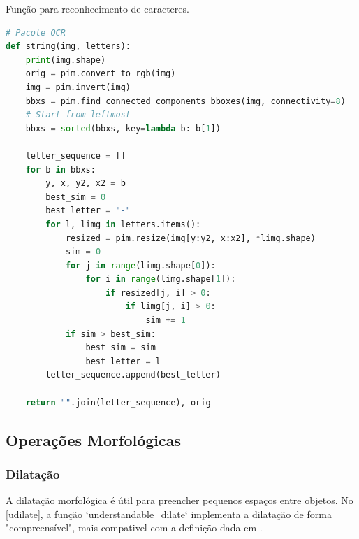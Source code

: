\documentclass[english, 
               brazil, 
               bsc] %
               {dcomp-abntex2}
\begin{document}
\begin{codigo}[h]
  \caption{\small Função para reconhecimento de caracteres.}
 \label{cod-ocr}
\begin{lstlisting}[language=python]
# Pacote OCR
def string(img, letters):
    print(img.shape)
    orig = pim.convert_to_rgb(img)
    img = pim.invert(img)
    bbxs = pim.find_connected_components_bboxes(img, connectivity=8)
    # Start from leftmost
    bbxs = sorted(bbxs, key=lambda b: b[1])

    letter_sequence = []
    for b in bbxs:
        y, x, y2, x2 = b
        best_sim = 0
        best_letter = "-"
        for l, limg in letters.items():
            resized = pim.resize(img[y:y2, x:x2], *limg.shape)
            sim = 0
            for j in range(limg.shape[0]):
                for i in range(limg.shape[1]):
                    if resized[j, i] > 0:
                        if limg[j, i] > 0:
                            sim += 1
            if sim > best_sim:
                best_sim = sim
                best_letter = l
        letter_sequence.append(best_letter)

    return "".join(letter_sequence), orig
\end{lstlisting}
\end{codigo}











\subsection{Operações Morfológicas}
\subsubsection{Dilatação}

 A dilatação morfológica é útil para preencher pequenos espaços entre objetos. No \autoref{udilate}, a função `understandable\_dilate` implementa a dilatação de forma "compreensível", mais compativel com a definição dada em \cite[9.2.2 Dilation]{gonzalez2008digital}.
\end{document}
